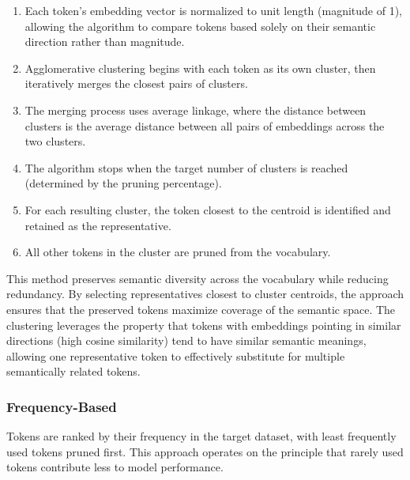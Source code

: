 \documentclass[twocolumn]{article}
\begin{document}
\begin{enumerate}
    \item Each token's embedding vector is normalized to unit length (magnitude of 1), allowing the algorithm to compare tokens based solely on their semantic direction rather than magnitude.
    \item Agglomerative clustering begins with each token as its own cluster, then iteratively merges the closest pairs of clusters.
    \item The merging process uses average linkage, where the distance between clusters is the average distance between all pairs of embeddings across the two clusters.
    \item The algorithm stops when the target number of clusters is reached (determined by the pruning percentage).
    \item For each resulting cluster, the token closest to the centroid is identified and retained as the representative.
    \item All other tokens in the cluster are pruned from the vocabulary.
\end{enumerate}
This method preserves semantic diversity across the vocabulary while reducing redundancy. By selecting representatives closest to cluster centroids, the approach ensures that the preserved tokens maximize coverage of the semantic space. The clustering leverages the property that tokens with embeddings pointing in similar directions (high cosine similarity) tend to have similar semantic meanings, allowing one representative token to effectively substitute for multiple semantically related tokens.

\subsubsection{Frequency-Based}
Tokens are ranked by their frequency in the target dataset, with least frequently used tokens pruned first. This approach operates on the principle that rarely used tokens contribute less to model performance.
\end{document}
